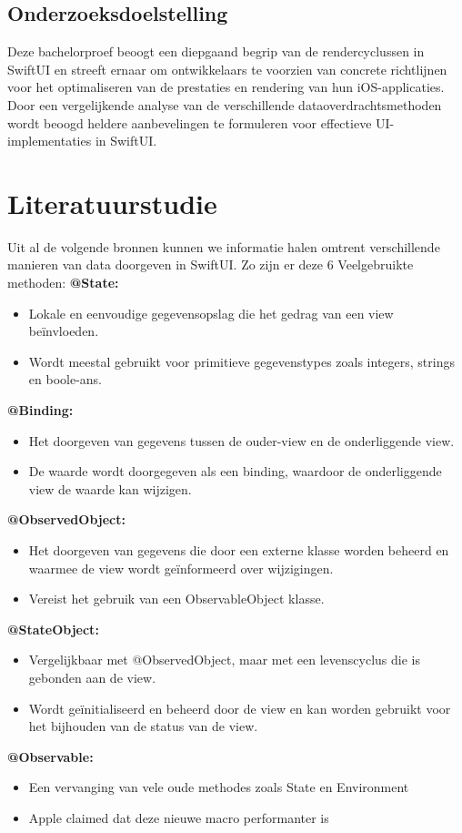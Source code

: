 \subsection{Onderzoeksdoelstelling}
Deze bachelorproef beoogt een diepgaand begrip van de rendercyclussen in SwiftUI en streeft ernaar om ontwikkelaars te voorzien van concrete richtlijnen voor het optimaliseren van de prestaties en rendering van hun iOS-applicaties. Door een vergelijkende analyse van de verschillende dataoverdrachtsmethoden wordt beoogd heldere aanbevelingen te formuleren voor effectieve UI-implementaties in SwiftUI.



\section{Literatuurstudie}%
\label{sec:state-of-the-art}

Uit al de volgende bronnen kunnen we informatie halen omtrent verschillende manieren van data doorgeven in SwiftUI. Zo zijn er deze 6 Veelgebruikte methoden:
\newline\textbf{@State:}
\begin{itemize}
    \item {Lokale en eenvoudige gegevensopslag die het gedrag van een view beïnvloeden.}
    \item {Wordt meestal gebruikt voor primitieve gegevenstypes zoals integers, strings en boole-\newline ans.}
\end{itemize}
\textbf{@Binding:}
\begin{itemize}
    \item {Het doorgeven van gegevens tussen de ouder-view en de onderliggende view.}
    \item {De waarde wordt doorgegeven als een binding, waardoor de onderliggende view de waarde kan wijzigen.}
\end{itemize}
\textbf{@ObservedObject:}
\begin{itemize}
    \item {Het doorgeven van gegevens die door een externe klasse worden beheerd en waarmee de view wordt geïnformeerd over wijzigingen.}
    \item {Vereist het gebruik van een ObservableObject klasse.}
\end{itemize}
\textbf{@StateObject:}
\begin{itemize}
    \item {Vergelijkbaar met @ObservedObject, maar met een levenscyclus die is gebonden aan de view.}
    \item {Wordt geïnitialiseerd en beheerd door de view en kan worden gebruikt voor het bijhouden van de status van de view.}
\end{itemize}
\textbf{@Observable:}
\begin{itemize}
    \item {Een vervanging van vele oude methodes zoals State en Environment}
    \item {Apple claimed dat deze nieuwe macro performanter is}
\end{itemize}




